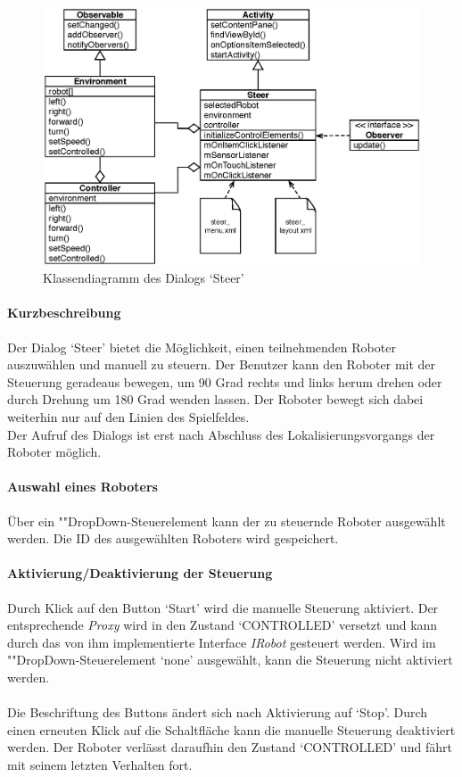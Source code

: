 \documentclass[10pt,a4paper]{article}
\begin{document}
	\begin{figure}[h]
			\centering
			\includegraphics[width=14cm]{images/entwurf_steer.eps}
  			\caption{Klassendiagramm des Dialogs `Steer'}
  	\end{figure}
	
	\paragraph*{Kurzbeschreibung}
	Der Dialog `Steer' bietet die Möglichkeit, einen teilnehmenden Roboter auszuwählen und manuell zu steuern. Der Benutzer kann den Roboter mit der
	Steuerung geradeaus bewegen, um 90 Grad rechts und links herum drehen oder durch Drehung um 180 Grad wenden lassen. Der Roboter bewegt sich dabei
	weiterhin nur auf den Linien des Spielfeldes. \\
	Der Aufruf des Dialogs ist erst nach Abschluss des Lokalisierungsvorgangs der Roboter möglich.
	
	\paragraph*{Auswahl eines Roboters}
	Über ein ""Drop\-Down-Steu\-er\-ele\-ment kann der zu steuernde Roboter ausgewählt werden. Die ID des ausgewählten Roboters wird gespeichert.
	
	\paragraph*{Aktivierung/Deaktivierung der Steuerung} Durch Klick auf den Button `Start' wird die manuelle Steuerung aktiviert. Der entsprechende
	\textit{Proxy} wird in den Zustand `CONTROLLED' versetzt und kann durch das von ihm implementierte Interface \textit{IRobot} gesteuert werden.
	Wird im ""Drop\-Down-Steu\-er\-ele\-ment `none' ausgewählt, kann die Steuerung nicht aktiviert werden. \\ \\
	Die Beschriftung des Buttons ändert sich nach Aktivierung auf `Stop'. Durch einen erneuten Klick auf die Schaltfläche kann die manuelle Steuerung
	deaktiviert werden. Der Roboter verlässt daraufhin den Zustand `CONTROLLED' und fährt mit seinem letzten Verhalten fort.
	
\end{document}
